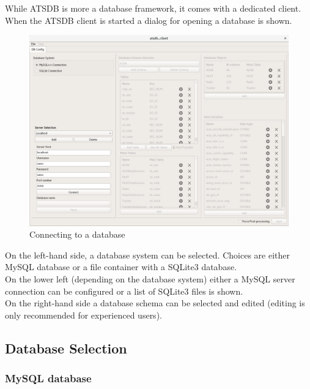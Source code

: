 \documentclass[10pt,letterpaper,extrafontsizes]{memoir}
\begin{document}
While ATSDB is more a database framework, it comes with a dedicated client. When the ATSDB client is started a dialog  for opening a database is shown. 

\begin{figure}[H]
  \hspace*{-2cm}
    \includegraphics[width=18cm]{../screenshots/db_config_connect.png}
  \caption{Connecting to a database}
  \label{fig:db_connect}
\end{figure}

On the left-hand side, a database system can be selected.  Choices are either MySQL database or a file container with a SQLite3 database. \\
On the lower left (depending on the database system) either a MySQL server connection can be configured or a list of SQLite3 files is shown.\\

On the right-hand side a database schema can be selected and edited (editing is only recommended for experienced users).

\subsection{Database Selection}
\subsubsection{MySQL database}
\end{document}
